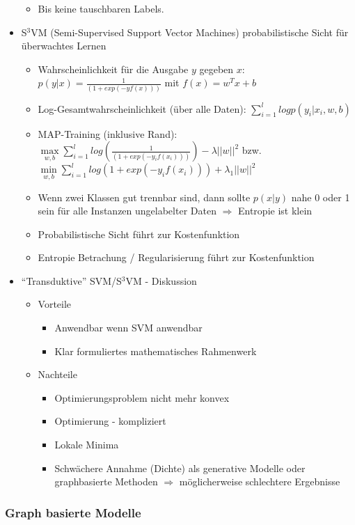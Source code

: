 \documentclass[paper=a4, fontsize=11pt]{scrartcl} %
\numberwithin{equation}{section} %
\numberwithin{figure}{section} %
\numberwithin{table}{section} %
\begin{document}
\begin{itemize}
\begin{itemize}
\item Bis keine tauschbaren Labels.
\end{itemize}
\item S$^3$VM (Semi-Supervised Support Vector Machines) probabilistische Sicht für überwachtes Lernen
\begin{itemize}
\item Wahrscheinlichkeit für die Ausgabe $y$ gegeben $x$: $p(y|x) = \frac{1}{(1+exp(-y f(x)))}$ mit $f(x) = w^T x + b$
\item Log-Gesamtwahrscheinlichkeit (über alle Daten): $\sum\limits_{i=1}^{l} log p(y_i|x_i,w,b)$
\item MAP-Training (inklusive Rand): $\max\limits_{w,b} \sum\limits_{i=1}^l log(\frac{1}{(1+exp(-y_i f(x_i)))}) - \lambda ||w||^2$ bzw. $\min\limits_{w,b} \sum\limits_{i=1}^l log(1+exp(-y_i f(x_i))) + \lambda_1 ||w||^2$
\item Wenn zwei Klassen gut trennbar sind, dann sollte $p(x|y)$ nahe 0 oder 1 sein für alle Instanzen ungelabelter Daten $\Rightarrow$ Entropie ist klein
\item Probabilistische Sicht führt zur Kostenfunktion
\item Entropie Betrachung / Regularisierung führt zur Kostenfunktion
\end{itemize}
\item ``Transduktive'' SVM/S$^3$VM - Diskussion
\begin{itemize}
\item Vorteile
\begin{itemize}
\item Anwendbar wenn SVM anwendbar
\item Klar formuliertes mathematisches Rahmenwerk
\end{itemize}
\item Nachteile
\begin{itemize}
\item Optimierungsproblem nicht mehr konvex
\item Optimierung - kompliziert
\item Lokale Minima
\item Schwächere Annahme (Dichte) als generative Modelle oder graphbasierte Methoden $\Rightarrow$ möglicherweise schlechtere Ergebnisse
\end{itemize}
\end{itemize}
\end{itemize}

\subsubsection{Graph basierte Modelle}
\end{document}
